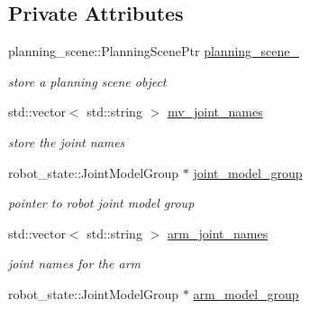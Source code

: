 \subsection*{Private Attributes}
\begin{DoxyCompactItemize}
\item 
\mbox{\label{classMOVEIT__IK_ad31a54376790256d55754c1d1a0c78f7}} 
planning\+\_\+scene\+::\+Planning\+Scene\+Ptr \hyperlink{classMOVEIT__IK_ad31a54376790256d55754c1d1a0c78f7}{planning\+\_\+scene\+\_\+}
\begin{DoxyCompactList}\small\item\em store a planning scene object \end{DoxyCompactList}\item 
\mbox{\label{classMOVEIT__IK_aa720def30962972d30dd6e0281683484}} 
std\+::vector$<$ std\+::string $>$ \hyperlink{classMOVEIT__IK_aa720def30962972d30dd6e0281683484}{mv\+\_\+joint\+\_\+names}
\begin{DoxyCompactList}\small\item\em store the joint names \end{DoxyCompactList}\item 
\mbox{\label{classMOVEIT__IK_a0222dac5b064cbff21ab98601bceadd1}} 
robot\+\_\+state\+::\+Joint\+Model\+Group $\ast$ \hyperlink{classMOVEIT__IK_a0222dac5b064cbff21ab98601bceadd1}{joint\+\_\+model\+\_\+group}
\begin{DoxyCompactList}\small\item\em pointer to robot joint model group \end{DoxyCompactList}\item 
\mbox{\label{classMOVEIT__IK_a11e1731426f82e3d6e17dcded5b93946}} 
std\+::vector$<$ std\+::string $>$ \hyperlink{classMOVEIT__IK_a11e1731426f82e3d6e17dcded5b93946}{arm\+\_\+joint\+\_\+names}
\begin{DoxyCompactList}\small\item\em joint names for the arm \end{DoxyCompactList}\item 
\mbox{\label{classMOVEIT__IK_a915a894a8c31ed440b5bde7dfb11b972}} 
robot\+\_\+state\+::\+Joint\+Model\+Group $\ast$ \hyperlink{classMOVEIT__IK_a915a894a8c31ed440b5bde7dfb11b972}{arm\+\_\+model\+\_\+group}

\end{DoxyCompactItemize}
